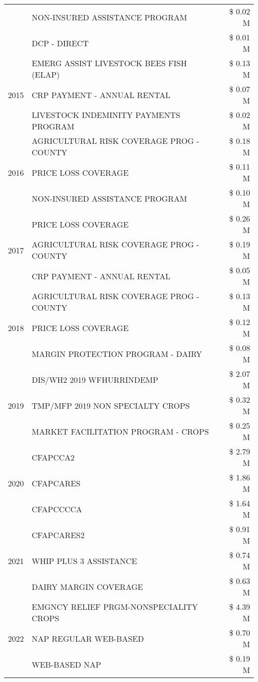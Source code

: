\begin{tabular}{llr}
 & NON-INSURED ASSISTANCE PROGRAM & \$ 0.02 M \\
 & DCP - DIRECT & \$ 0.01 M \\
\cline{1-3}
\multirow[t]{3}{*}{2015} & EMERG ASSIST LIVESTOCK BEES FISH (ELAP) & \$ 0.13 M \\
 & CRP PAYMENT - ANNUAL RENTAL & \$ 0.07 M \\
 & LIVESTOCK INDEMINITY PAYMENTS PROGRAM & \$ 0.02 M \\
\cline{1-3}
\multirow[t]{3}{*}{2016} & AGRICULTURAL RISK COVERAGE PROG - COUNTY & \$ 0.18 M \\
 & PRICE LOSS COVERAGE & \$ 0.11 M \\
 & NON-INSURED ASSISTANCE PROGRAM & \$ 0.10 M \\
\cline{1-3}
\multirow[t]{3}{*}{2017} & PRICE LOSS COVERAGE & \$ 0.26 M \\
 & AGRICULTURAL RISK COVERAGE PROG - COUNTY & \$ 0.19 M \\
 & CRP PAYMENT - ANNUAL RENTAL & \$ 0.05 M \\
\cline{1-3}
\multirow[t]{3}{*}{2018} & AGRICULTURAL RISK COVERAGE PROG - COUNTY & \$ 0.13 M \\
 & PRICE LOSS COVERAGE & \$ 0.12 M \\
 & MARGIN PROTECTION PROGRAM - DAIRY & \$ 0.08 M \\
\cline{1-3}
\multirow[t]{3}{*}{2019} & DIS/WH2 2019 WFHURRINDEMP & \$ 2.07 M \\
 & TMP/MFP 2019 NON SPECIALTY CROPS & \$ 0.32 M \\
 & MARKET FACILITATION PROGRAM - CROPS & \$ 0.25 M \\
\cline{1-3}
\multirow[t]{3}{*}{2020} & CFAPCCA2 & \$ 2.79 M \\
 & CFAPCARES & \$ 1.86 M \\
 & CFAPCCCCA & \$ 1.64 M \\
\cline{1-3}
\multirow[t]{3}{*}{2021} & CFAPCARES2 & \$ 0.91 M \\
 & WHIP PLUS 3 ASSISTANCE & \$ 0.74 M \\
 & DAIRY MARGIN COVERAGE & \$ 0.63 M \\
\cline{1-3}
\multirow[t]{3}{*}{2022} & EMGNCY RELIEF PRGM-NONSPECIALITY CROPS & \$ 4.39 M \\
 & NAP REGULAR WEB-BASED & \$ 0.70 M \\
 & WEB-BASED NAP & \$ 0.19 M \\
\cline{1-3}
\bottomrule
\end{tabular}
